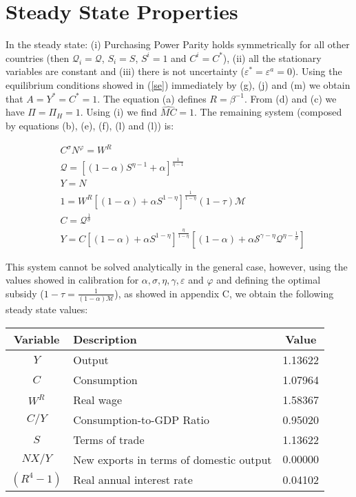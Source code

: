 \documentclass{article}
\begin{document}
\section{Steady State Properties}
In the steady state: (i) Purchasing Power Parity holds symmetrically for all other countries (then $\mathcal Q_i = \mathcal Q$, $S_i = S$, $S^i=1$ and $C^i = C^*$), (ii) all the stationary variables are constant and (iii) there is not uncertainty ($\varepsilon^* = \varepsilon^a = 0$).  Using the equilibrium conditions showed in (\ref{se}) immediately by (g), (j) and (m) we obtain that $A = Y^* = C^* = 1$. The equation (a) defines $R = \beta^{-1}$. From (d) and (c) we have $\Pi = \Pi_H = 1$. Using (i) we find $\widehat{MC} = 1$. The remaining system (composed by equations (b), (e), (f), (l) and (l)) is:

\begin{subequations}
    \label{ser}
    \begin{align}
        & C^\sigma N^\varphi = W^R \\
        &\mathcal{Q} = \left[(1-\alpha)S^{\eta-1} + \alpha \right]^{\frac{1}{\eta-1}}\\
        &Y =  N\\
        &1 = W^R \left[(1-\alpha) + \alpha S^{1-\eta} \right]^{\frac{1}{1-\eta}} (1 - \tau) \mathcal M\\
        &C = \mathcal Q^{\frac{1}{\sigma}}\\
        &Y = C \left[(1-\alpha) + \alpha S^{1-\eta} \right]^{\frac{\eta}{1-\eta}} \left[(1-\alpha)  +  \alpha \mathcal S^{\gamma - \eta} \mathcal Q^{\eta - \frac{1}{\sigma}} \right]
    \end{align}
\end{subequations}

This system cannot be solved analytically in the general case, however, using the values showed in calibration for $\alpha, \sigma, \eta, \gamma, \varepsilon$ and $\varphi$ and defining the optimal subsidy ($ 1-\tau = \frac{1}{(1-\alpha)\mathcal M}  $), as showed in appendix C, we obtain the following steady state values:

\begin{table}[H]
    \centering
    \begin{tabular}{clc}
        \hline
        \textbf{Variable} & \textbf{Description} & \textbf{Value}\\
        \hline
        $Y$ & Output & 1.13622 \\
        $C$ & Consumption & 1.07964 \\
        $W^R$ & Real wage & 1.58367 \\
        $C/Y$ & Consumption-to-GDP Ratio & 0.95020 \\
        $S$ & Terms of trade & 1.13622 \\
        $NX/Y$ & New exports in terms of domestic output & $0.00000$\\
        $(R^4 -1)$ & Real annual interest rate &  0.04102\\
        \hline
    \end{tabular}
\end{table}
\end{document}
